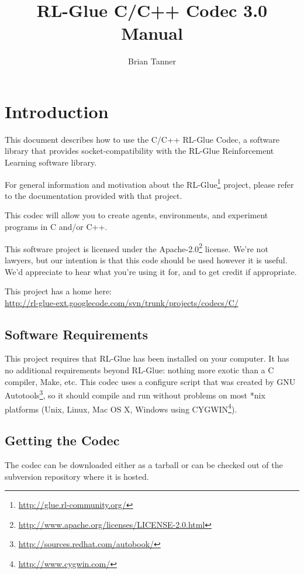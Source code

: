 \documentclass[11pt]{article}
\title{RL-Glue C/C++ Codec 3.0 Manual }
\author{Brian Tanner}
\date{}
\begin{document}
\maketitle
\tableofcontents

\section{Introduction}

This document describes how to use the C/C++ RL-Glue Codec, a software library that provides socket-compatibility with the RL-Glue Reinforcement Learning software library.  

For general information and motivation about the RL-Glue\footnote{\url{http://glue.rl-community.org/}} project, please refer to the documentation provided with that project.

This codec will allow you to create agents, environments, and experiment programs in C and/or C++.

This software project is licensed under the Apache-2.0\footnote{\url{http://www.apache.org/licenses/LICENSE-2.0.html}} license. We're not lawyers, but our intention is that this code 
should be used however it is useful.  We'd appreciate to hear what you're using it for, and to get credit if appropriate.

This project has a home here:\\
\url{http://rl-glue-ext.googlecode.com/svn/trunk/projects/codecs/C/}



\subsection{Software Requirements}
This project requires that RL-Glue has been installed on your computer.  It has no additional requirements beyond RL-Glue: nothing more exotic than a C compiler, Make, etc.  This codec uses a configure script that was created by GNU Autotools\footnote{\url{http://sources.redhat.com/autobook/}}, so it should compile and run without problems on most *nix platforms (Unix, Linux, Mac OS X, Windows using CYGWIN\footnote{\url{http://www.cygwin.com/}}). 

\subsection{Getting the Codec}
The codec can be downloaded either as a tarball or can be checked out of the subversion repository where it is hosted.
\end{document}
